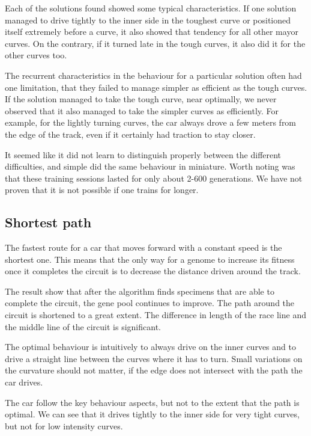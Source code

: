Each of the solutions found showed some typical characteristics. If one solution managed to drive tightly to the inner side in the toughest curve or positioned itself extremely before a curve, it also showed that tendency for all other mayor curves. On the contrary, if it turned late in the tough curves, it also did it for the other curves too.

The recurrent characteristics in the behaviour for a particular solution often had one limitation, that they failed to manage simpler as efficient as the tough curves. If the solution managed to take the tough curve, near optimally, we never observed that it also managed to take the simpler curves as efficiently. For example, for the lightly turning curves, the car always drove a few meters from the edge of the track, even if it certainly had traction to stay closer. 

It seemed like it did not learn to distinguish properly between the different difficulties, and simple did the same behaviour in miniature. Worth noting was that these training sessions lasted for only about 2-600 generations. We have not proven that it is not possible if one trains for longer.


\subsection{Shortest path}

The fastest route for a car that moves forward with a constant speed is the shortest one. This means that the only way for a genome to increase its fitness once it completes the circuit is to decrease the distance driven around the track.  

The result show that after the algorithm finds specimens that are able to complete the circuit, the gene pool continues to improve. The path around the circuit is shortened to a great extent. The difference in length of the race line and the middle line of the circuit is significant. 

The optimal behaviour is intuitively to always drive on the inner curves and to drive a straight line between the curves where it has to turn. Small variations on the curvature should not matter, if the edge does not intersect with the path the car drives.

The car follow the key behaviour aspects, but not to the extent that the path is optimal. We can see that it drives tightly to the inner side for very tight curves, but not for low intensity curves.

